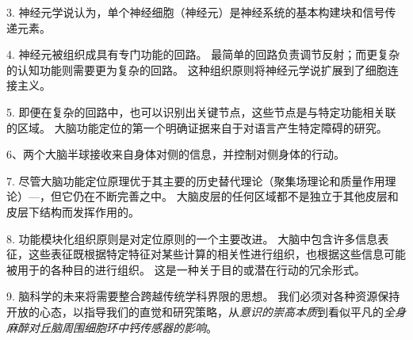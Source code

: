 3. 神经元学说认为，单个神经细胞（神经元）是神经系统的基本构建块和信号传递元素。


4. 神经元被组织成具有专门功能的回路。
最简单的回路负责调节反射；而更复杂的认知功能则需要更为复杂的回路。
这种组织原则将神经元学说扩展到了细胞连接主义。


5. 即便在复杂的回路中，也可以识别出关键节点，这些节点是与特定功能相关联的区域。
大脑功能定位的第一个明确证据来自于对语言产生特定障碍的研究。


6、两个大脑半球接收来自身体对侧的信息，并控制对侧身体的行动。


7. 尽管大脑功能定位原理优于其主要的历史替代理论（聚集场理论和质量作用理论）—，但它仍在不断完善之中。
大脑皮层的任何区域都不是独立于其他皮层和皮层下结构而发挥作用的。


8. 功能模块化组织原则是对定位原则的一个主要改进。
大脑中包含许多信息表征，这些表征既根据特定特征对某些计算的相关性进行组织，也根据这些信息可能被用于的各种目的进行组织。
这是一种关于目的或潜在行动的冗余形式。


9. 脑科学的未来将需要整合跨越传统学科界限的思想。
我们必须对各种资源保持开放的心态，以指导我们的直觉和研究策略，从\textit{意识的崇高本质}到看似平凡的\textit{全身麻醉对丘脑周围细胞环中钙传感器的影响}。



















